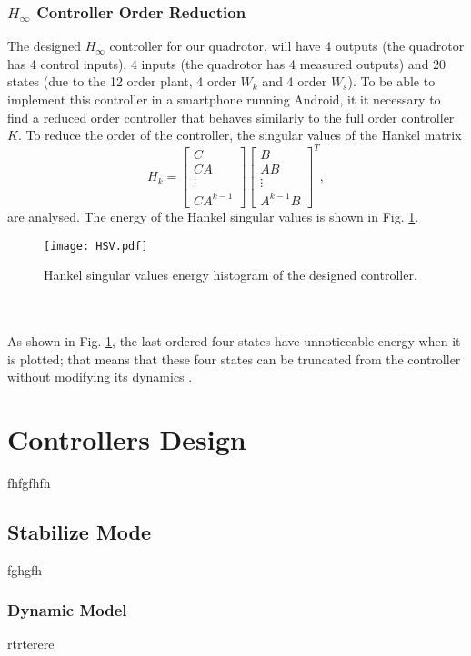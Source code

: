 \subsubsection{$H_\infty$ Controller Order Reduction}
The designed $H_{\infty}$ controller for our quadrotor, will have 4 outputs (the quadrotor has 4 control inputs), 4 inputs (the quadrotor has 4 measured outputs) and 20 states (due to the 12 order plant, 4 order $W_{k}$ and 4 order $W_s$). To be able to implement this controller in a smartphone running Android, it it necessary to find a reduced order controller that behaves similarly to the full order controller $K$. To reduce the order of the controller, the singular values of the Hankel matrix
\begin{equation}
H_{k} = \begin{bmatrix}
C\\
CA\\
\vdots\\
CA^{k-1}
\end{bmatrix}
\begin{bmatrix}
B\\ AB \\ \vdots \\ A^{k-1}B
\end{bmatrix}^{T},
\end{equation}
are analysed. The energy of the Hankel singular values is shown in Fig. \ref{fig:hsv}.
\begin{figure}[h]
\begin{center}
\texttt{[image: HSV.pdf]}  
\caption{Hankel singular values energy histogram of the designed controller.} 
\label{fig:hsv}
\end{center}
\end{figure}
\\\\As shown in Fig. \ref{fig:hsv}, the last ordered four states have unnoticeable energy when it is plotted; that means that these four states can be truncated from the controller without modifying its dynamics \cite{Skogestad2005}. 

\section{Controllers Design}
fhfgfhfh
\subsection{Stabilize Mode}
fghgfh
\subsubsection{Dynamic Model}
rtrterere
